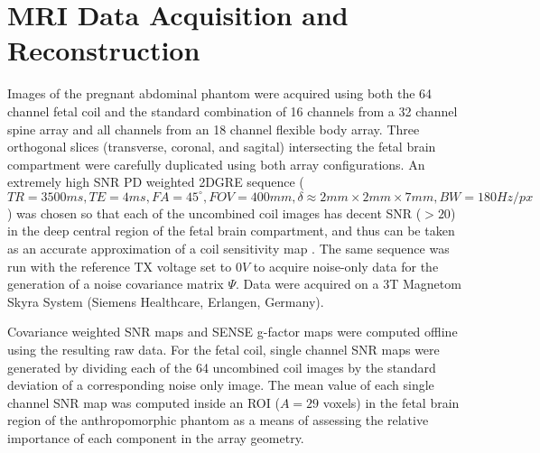 \section{MRI Data Acquisition and Reconstruction}
Images of the pregnant abdominal phantom were acquired using both the 64 channel fetal coil and the standard
combination of 16 channels from a 32 channel spine array and all channels from an 18 channel flexible body array. Three
orthogonal slices (transverse, coronal, and sagital) intersecting the fetal brain compartment were carefully duplicated
using both array configurations. An extremely high SNR PD weighted 2DGRE sequence ($TR=3500ms, TE=4ms, FA=45^{\circ},
FOV=400mm, \delta \approx 2mm \times 2mm \times 7mm, BW=180Hz/px$) was chosen so that each of the uncombined coil images
has decent SNR ($>20$) in the deep central region of the fetal brain compartment, and thus can be taken as an accurate
approximation of a coil sensitivity map \cite{Roemer90}. The same sequence was run with the reference TX voltage set to
$0V$ to acquire noise-only data for the generation of a noise covariance matrix $\Psi$. Data were acquired on a 3T
Magnetom Skyra System (Siemens Healthcare, Erlangen, Germany).

Covariance weighted SNR maps and SENSE g-factor maps were computed offline using the resulting raw data. For the fetal
coil, single channel SNR maps were generated by dividing each of the 64 uncombined coil images by the standard deviation
of a corresponding noise only image. The mean value of each single channel SNR map was computed inside an ROI ($A=29$
voxels) in the fetal brain region of the anthropomorphic phantom as a means of assessing the relative importance of each
component in the array geometry.


